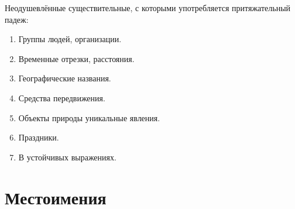 \documentclass[oneside]{book}
\begin{document}
\begin{enumerate}
    Неодушевлённые существительные,
    с которыми употребляется
    притяжательный падеж:
    \begin{enumerate}
        \item Группы людей, организации.
        \item Временные отрезки, расстояния.
        \item Географические названия.
        \item Средства передвижения.
        \item Объекты природы уникальные явления.
        \item Праздники.
        \item В устойчивых выражениях.
    \end{enumerate}
\end{enumerate}

\chapter{Местоимения}
\end{document}
